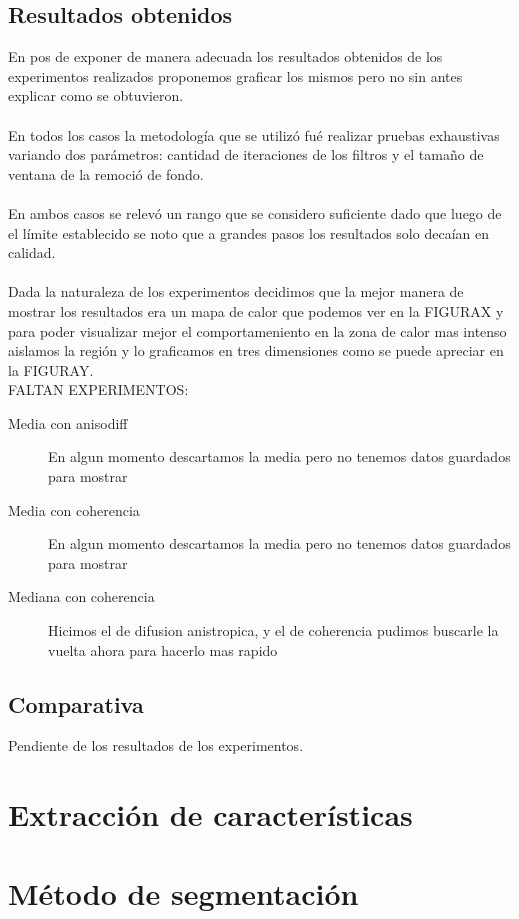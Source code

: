 \subsection{Resultados obtenidos}

En pos de exponer de manera adecuada los resultados obtenidos de los experimentos realizados proponemos graficar los mismos pero no sin antes explicar como se obtuvieron.\\
\\En todos los casos la metodolog\'ia que se utiliz\'o fu\'e realizar pruebas exhaustivas variando dos par\'ametros: cantidad de iteraciones de los filtros y el tamaño de ventana de la remoci\'o de fondo.\\
\\En ambos casos se relev\'o un rango que se considero suficiente dado que luego de el límite establecido se noto que a grandes pasos los resultados solo deca\'ian en calidad.\\
\\Dada la naturaleza de los experimentos decidimos que la mejor manera de mostrar los resultados era un mapa de calor que podemos ver en la FIGURAX y para poder visualizar mejor el comportameniento en la zona de calor mas intenso aislamos la regi\'on y lo graficamos en tres dimensiones como se puede apreciar en la FIGURAY.\\

FALTAN EXPERIMENTOS:
\begin{description}
  \item[Media con anisodiff] En algun momento descartamos la media pero no tenemos datos guardados para mostrar
  \item[Media con coherencia] En algun momento descartamos la media pero no tenemos datos guardados para mostrar
  \item[Mediana con coherencia] Hicimos el de difusion anistropica, y el de coherencia pudimos buscarle la vuelta ahora para hacerlo mas rapido
\end{description}

\subsection{Comparativa}

Pendiente de los resultados de los experimentos.

\section{Extracci\'on de caracter\'isticas}

\section{M\'etodo de segmentaci\'on}
